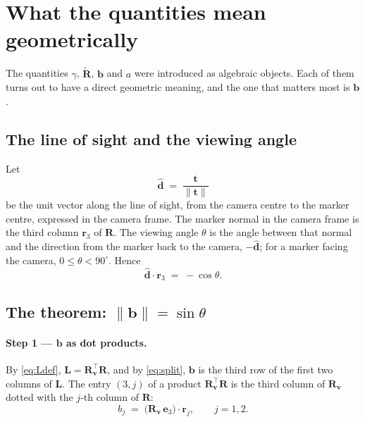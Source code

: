 \documentclass[11pt,a4paper]{article}
\theoremstyle{remark}
\newcommand{\Rmat}{\mathbf{R}}
\newcommand{\Rtil}{\widetilde{\mathbf{R}}}
\newcommand{\Lmat}{\mathbf{L}}
\newcommand{\Rvee}{\mathbf{R}_{\vvec}}
\newcommand{\bvec}{\mathbf{b}}
\newcommand{\evec}{\mathbf{e}}
\newcommand{\rvec}{\mathbf{r}}
\newcommand{\tvec}{\mathbf{t}}
\newcommand{\vvec}{\mathbf{v}}
\newcommand{\dhat}{\hat{\mathbf{d}}}
\begin{document}
\section{What the quantities mean geometrically}
\label{sec:geometry}

The quantities $\gamma$, $\Rtil$, $\bvec$ and $a$ were introduced as algebraic
objects. Each of them turns out to have a direct geometric meaning, and the one
that matters most is $\bvec$.

\subsection{The line of sight and the viewing angle}

Let
\begin{equation}
  \dhat \;=\; \frac{\tvec}{\|\tvec\|}
  \label{eq:dhat}
\end{equation}
be the unit vector along the line of sight, from the camera centre to the marker
centre, expressed in the camera frame. The marker normal in the camera frame is
the third column $\rvec_3$ of $\Rmat$. The viewing angle $\theta$ is the angle
between that normal and the direction from the marker back to the camera,
$-\dhat$; for a marker facing the camera, $0 \le \theta < 90^{\circ}$. Hence
\begin{equation}
  \dhat \cdot \rvec_3 \;=\; -\cos\theta .
  \label{eq:dn}
\end{equation}

\subsection{The theorem: $\|\bvec\| = \sin\theta$}

\paragraph{Step 1 --- $\bvec$ as dot products.} By \eqref{eq:Ldef},
$\Lmat = \Rvee^{\top}\Rmat$, and by \eqref{eq:split}, $\bvec$ is the third row of
the first two columns of $\Lmat$. The entry $(3,j)$ of a product
$\Rvee^{\top}\Rmat$ is the third column of $\Rvee$ dotted with the $j$-th column
of $\Rmat$:
\begin{equation}
  b_j \;=\; \big(\Rvee\,\evec_3\big) \cdot \rvec_j ,
  \qquad j = 1,2 .
  \label{eq:bdot}
\end{equation}
\end{document}
